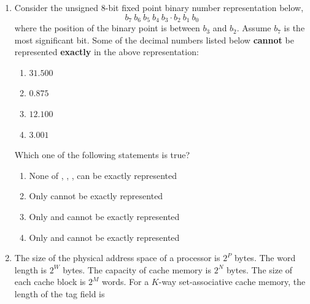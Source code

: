 \documentclass[journal,12pt,onecolumn]{IEEEtran}
\theoremstyle{remark}
\begin{document}
\begin{enumerate}
\hfill{}

\begin{enumerate}
	\begin{multicols}{4}
		\item $4$
		\item $5$
		\item $6$
		\item $40$
	\end{multicols}
\end{enumerate}

\item Consider the unsigned $8$-bit fixed point binary number representation below,
$$ b_7 \ b_6 \ b_5 \ b_4 \ b_3 \cdot b_2 \ b_1 \ b_0 $$
where the position of the binary point is between $b_3$ and $b_2$. Assume $b_7$ is the most significant bit. Some of the decimal numbers listed below \textbf{cannot} be represented \textbf{exactly} in the above representation:
\begin{enumerate}
	\item[\brak{\text{i}}] $31.500$
	\item[\brak{\text{ii}}] $0.875$
	\item[\brak{\text{iii}}] $12.100$
	\item[\brak{\text{iv}}] $3.001$
\end{enumerate}
Which one of the following statements is true?

\hfill{}

\begin{enumerate}
	\item None of , , ,  can be exactly represented
	\item Only  cannot be exactly represented
	\item Only  and  cannot be exactly represented
	\item Only  and  cannot be exactly represented
\end{enumerate}

\item The size of the physical address space of a processor is $2^P$ bytes. The word length is $2^W$ bytes. The capacity of cache memory is $2^N$ bytes. The size of each cache block is $2^M$ words. For a $K$-way set-associative cache memory, the length  of the tag field is

\hfill{}


\end{enumerate}
\end{document}
